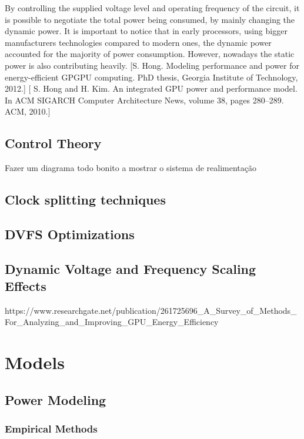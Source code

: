 By controlling the supplied voltage level and operating frequency of the circuit, it is possible to negotiate the total power being consumed, by mainly changing the dynamic power. It is important to notice that in early processors, using bigger manufacturers technologies compared to modern ones, the dynamic power accounted for the majority of power consumption. However,  nowadays the static power is also contributing heavily. [S. Hong. Modeling performance and power for energy-efficient GPGPU computing. PhD thesis, Georgia Institute of Technology, 2012.] [ S. Hong and H. Kim. An integrated GPU power and performance model. In ACM SIGARCH Computer Architecture News, volume 38, pages 280–289. ACM, 2010.]

\subsection{Control Theory}
Fazer um diagrama todo bonito a mostrar o sistema de realimentação

\subsection{Clock splitting techniques}

\subsection{DVFS Optimizations}

\subsection{Dynamic Voltage and Frequency Scaling Effects}
https://www.researchgate.net/publication/261725696_A_Survey_of_Methods_For_Analyzing_and_Improving_GPU_Energy_Efficiency




\section{Models}
\subsection{Power Modeling}
\label{section:powermodels}
\subsubsection{Empirical Methods}
